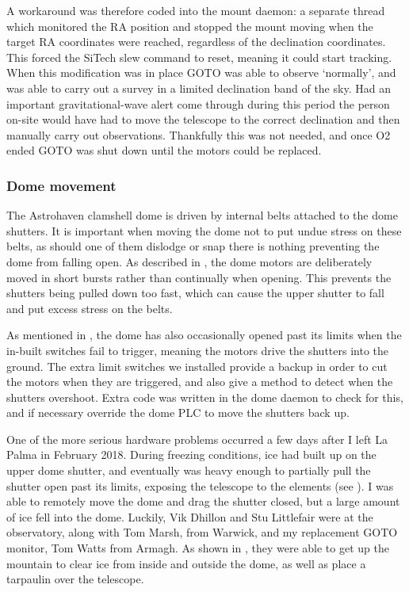 \begin{colsection}
\begin{colsection}
A workaround was therefore coded into the mount daemon: a separate thread which monitored the RA position and stopped the mount moving when the target RA coordinates were reached, regardless of the declination coordinates. This forced the SiTech slew command to reset, meaning it could start tracking. When this modification was in place GOTO was able to observe `normally', and was able to carry out a survey in a limited declination band of the sky. Had an important gravitational-wave alert come through during this period the person on-site would have had to move the telescope to the correct declination and then manually carry out observations. Thankfully this was not needed, and once O2 ended GOTO was shut down until the motors could be replaced.

\subsubsection{Dome movement}

The Astrohaven clamshell dome is driven by internal belts attached to the dome shutters. It is important when moving the dome not to put undue stress on these belts, as should one of them dislodge or snap there is nothing preventing the dome from falling open. As described in , the dome motors are deliberately moved in short bursts rather than continually when opening. This prevents the shutters being pulled down too fast, which can cause the upper shutter to fall and put excess stress on the belts.

As mentioned in , the dome has also occasionally opened past its limits when the in-built switches fail to trigger, meaning the motors drive the shutters into the ground. The extra limit switches we installed provide a backup in order to cut the motors when they are triggered, and also give a method to detect when the shutters overshoot. Extra code was written in the dome daemon to check for this, and if necessary override the dome PLC to move the shutters back up.

One of the more serious hardware problems occurred a few days after I left La Palma in February 2018. During freezing conditions, ice had built up on the upper dome shutter, and eventually was heavy enough to partially pull the shutter open past its limits, exposing the telescope to the elements (see ). I was able to remotely move the dome and drag the shutter closed, but a large amount of ice fell into the dome. Luckily, Vik Dhillon and Stu Littlefair were at the observatory, along with Tom Marsh, from Warwick, and my replacement GOTO monitor, Tom Watts from Armagh. As shown in , they were able to get up the mountain to clear ice from inside and outside the dome, as well as place a tarpaulin over the telescope.


\end{colsection}
\end{colsection}
